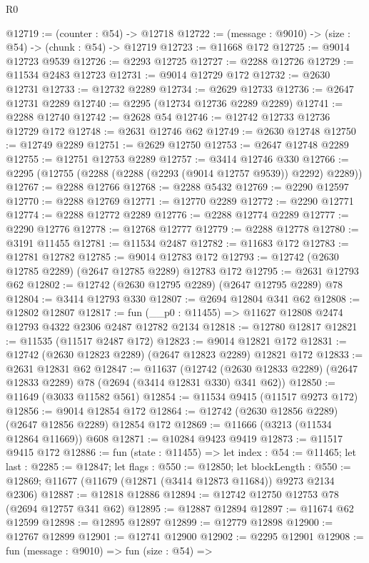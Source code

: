 \begin{lexlean}{R0}
\begin{coremodule}
@12719 := (counter : @54) -> @12718
@12722 := (message : @9010) -> (size : @54) -> (chunk : @54) -> @12719
@12723 := @11668 @172
@12725 := @9014 @12723 @9539
@12726 := @2293 @12725
@12727 := @2288 @12726
@12729 := @11534 @2483 @12723
@12731 := @9014 @12729 @172
@12732 := @2630 @12731
@12733 := @12732 @2289
@12734 := @2629 @12733
@12736 := @2647 @12731 @2289
@12740 := @2295 (@12734 @12736 @2289 @2289)
@12741 := @2288 @12740
@12742 := @2628 @54
@12746 := @12742 @12733 @12736 @12729 @172
@12748 := @2631 @12746 @62
@12749 := @2630 @12748
@12750 := @12749 @2289
@12751 := @2629 @12750
@12753 := @2647 @12748 @2289
@12755 := @12751 @12753 @2289
@12757 := @3414 @12746 @330
@12766 := @2295 (@12755 (@2288 (@2288 (@2293 (@9014 @12757 @9539)) @2292) @2289))
@12767 := @2288 @12766
@12768 := @2288 @5432
@12769 := @2290 @12597
@12770 := @2288 @12769
@12771 := @12770 @2289
@12772 := @2290 @12771
@12774 := @2288 @12772 @2289
@12776 := @2288 @12774 @2289
@12777 := @2290 @12776
@12778 := @12768 @12777
@12779 := @2288 @12778
@12780 := @3191 @11455
@12781 := @11534 @2487
@12782 := @11683 @172
@12783 := @12781 @12782
@12785 := @9014 @12783 @172
@12793 := @12742 (@2630 @12785 @2289) (@2647 @12785 @2289) @12783 @172
@12795 := @2631 @12793 @62
@12802 := @12742 (@2630 @12795 @2289) (@2647 @12795 @2289) @78
@12804 := @3414 @12793 @330
@12807 := @2694 @12804 @341 @62
@12808 := @12802 @12807
@12817 := fun (__p0 : @11455) => @11627 @12808 @2474 @12793 @4322 @2306 @2487 @12782 @2134
@12818 := @12780 @12817
@12821 := @11535 (@11517 @2487 @172)
@12823 := @9014 @12821 @172
@12831 := @12742 (@2630 @12823 @2289) (@2647 @12823 @2289) @12821 @172
@12833 := @2631 @12831 @62
@12847 := @11637
    (@12742 (@2630 @12833 @2289) (@2647 @12833 @2289) @78 (@2694 (@3414 @12831 @330) @341 @62))
@12850 := @11649 (@3033 @11582 @561)
@12854 := @11534 @9415 (@11517 @9273 @172)
@12856 := @9014 @12854 @172
@12864 := @12742 (@2630 @12856 @2289) (@2647 @12856 @2289) @12854 @172
@12869 := @11666 (@3213 (@11534 @12864 @11669)) @608
@12871 := @10284 @9423 @9419
@12873 := @11517 @9415 @172
@12886 := fun (state : @11455) =>
  let index : @54 := @11465;
  let last : @2285 := @12847;
  let flags : @550 := @12850;
  let blockLength : @550 := @12869; @11677 (@11679 (@12871 (@3414 @12873 @11684)) @9273 @2134 @2306)
@12887 := @12818 @12886
@12894 := @12742 @12750 @12753 @78 (@2694 @12757 @341 @62)
@12895 := @12887 @12894
@12897 := @11674 @62 @12599
@12898 := @12895 @12897
@12899 := @12779 @12898
@12900 := @12767 @12899
@12901 := @12741 @12900
@12902 := @2295 @12901
@12908 := fun (message : @9010) =>
  fun (size : @54) =>

\end{coremodule}
\end{lexlean}
